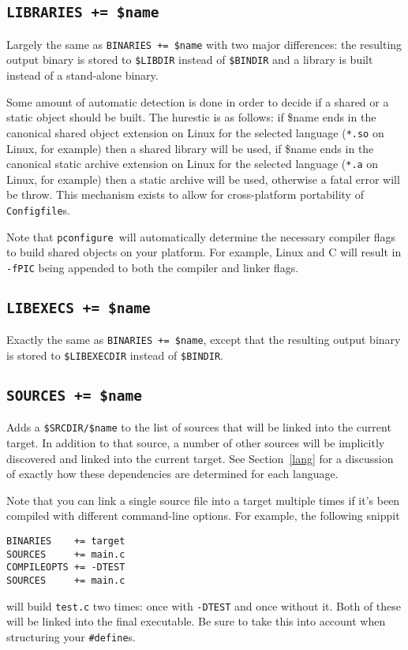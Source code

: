 \documentclass{article}
\newcommand{\pconfigure}{\texttt{pconfigure}}
\begin{document}
\subsection{\texttt{LIBRARIES += \$name} \label{cmd:libraries}}

Largely the same as \texttt{BINARIES += \$name} with two major
differences: the resulting output binary is stored to
\texttt{\$LIBDIR} instead of \texttt{\$BINDIR} and a library is built
instead of a stand-alone binary.

Some amount of automatic detection is done in order to decide if a
shared or a static object should be built.  The hurestic is as
follows: if \$name ends in the canonical shared object extension on
Linux for the selected language (\texttt{*.so} on Linux, for example)
then a shared library will be used, if \$name ends in the canonical
static archive extension on Linux for the selected language
(\texttt{*.a} on Linux, for example) then a static archive will be
used, otherwise a fatal error will be throw.  This mechanism exists to
allow for cross-platform portability of \texttt{Configfile}s.

Note that \pconfigure\ will automatically determine the necessary
compiler flags to build shared objects on your platform.  For example,
Linux and C will result in \texttt{-fPIC} being appended to both the
compiler and linker flags.

\subsection{\texttt{LIBEXECS += \$name} \label{cmd:libexecs}}

Exactly the same as \texttt{BINARIES += \$name}, except that the
resulting output binary is stored to \texttt{\$LIBEXECDIR} instead of
\texttt{\$BINDIR}.

\subsection{\texttt{SOURCES += \$name} \label{cmd:sources}}

Adds a \texttt{\$SRCDIR/\$name} to the list of sources that will be
linked into the current target.  In addition to that source, a number
of other sources will be implicitly discovered and linked into the
current target.  See Section~\ref{lang} for a discussion of exactly
how these dependencies are determined for each language.

Note that you can link a single source file into a target multiple
times if it's been compiled with different command-line options.  For
example, the following snippit
\begin{verbatim}
BINARIES    += target
SOURCES     += main.c
COMPILEOPTS += -DTEST
SOURCES     += main.c
\end{verbatim}
will build \texttt{test.c} two times: once with \texttt{-DTEST} and
once without it.  Both of these will be linked into the final
executable.  Be sure to take this into account when structuring your
\texttt{\#define}s.
\end{document}
